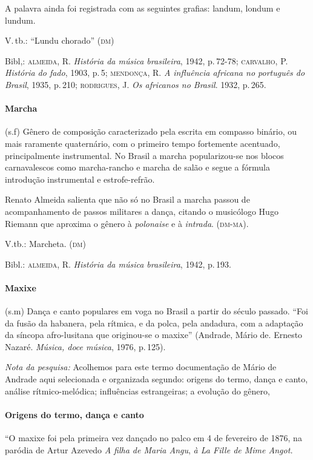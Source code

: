 A palavra ainda foi registrada com as seguintes grafias: landum, londum
e lundum.

V.\,tb.: ``Lundu chorado'' (\textsc{dm})

Bibl,: \textsc{almeida}, R. \textit{História da música brasileira}, 1942, p.\,72-78;
\textsc{carvalho}, P. \textit{História do fado}, 1903, p.\,5; \textsc{mendonça}, R. \textit{A influência
africana no português do Brasil}, 1935, p.\,210; \textsc{rodrigues}, J. \textit{Os africanos
no Brasil}. 1932, p.\,265.

\paragraph{Marcha} (s.f) Gênero de composição caracterizado pela escrita
em compasso binário, ou mais raramente quaternário, com o primeiro tempo
fortemente acentuado, principalmente instrumental. No Brasil a marcha
popularizou-se nos blocos carnavalescos como marcha-rancho e marcha de
salão e segue a fórmula introdução instrumental e estrofe-refrão.

Renato Almeida salienta que não só no Brasil a marcha passou de
acompanhamento de passos militares a dança, citando o musicólogo Hugo
Riemann que aproxima o gênero à \textit{polonaise} e à \textit{intrada}. (\textsc{dm-ma}).

V.tb.: Marcheta. (\textsc{dm})

Bibl.: \textsc{almeida}, R. \emph{História da música brasileira}, 1942, p.\,193.

\paragraph{Maxixe} (s.m) Dança e canto populares em voga no Brasil a
partir do século passado. ``Foi da fusão da habanera, pela rítmica, e da
polca, pela andadura, com a adaptação da síncopa afro-lusitana que
originou-se o maxixe'' (Andrade, Mário de. Ernesto Nazaré. \emph{Música,
doce música}, 1976, p.\,125).

\emph{Nota da pesquisa:} Acolhemos para este termo documentação de Mário
de Andrade aqui selecionada e organizada segundo: origens do termo,
dança e canto, análise rítmico-melódica; influências estrangeiras; a
evolução do gênero,

\paragraph{Origens do termo, dança e canto}

``O maxixe foi pela primeira vez dançado no palco em 4 de fevereiro de
1876, na paródia de Artur Azevedo \emph{A filha de Maria Angu}, \emph{à
La Fille de Mime Angot.}

